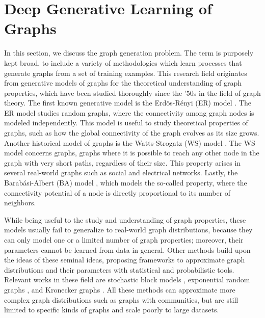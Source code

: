 \section{Deep Generative Learning of Graphs}
In this section, we discuss the graph generation problem. The term  is purposely kept broad, to include a variety of methodologies which learn processes that generate graphs from a set of training examples. This research field originates from generative models of graphs for the theoretical understanding of graph properties, which have been studied thoroughly since the '50s in the field of graph theory. The first known generative model is the  Erd\"{o}s-R\'{e}nyi (ER) model \cite{erdos1959randomgraphs}. The ER model studies random graphs, where the connectivity among graph nodes is modeled independently. This model is useful to study theoretical properties of graphs, such as how the global connectivity of the graph evolves as its size grows. Another historical model of graphs is the  Watts-Strogatz (WS)  model \cite{watts1998smallworld}. The WS model concerns  graphs, \ie graphs where it is possible to reach any other node in the graph with very short paths, regardless of their size. This property arises in several real-world graphs such as social and electrical networks. Lastly, the Barab{\'a}si-Albert (BA) model \cite{barabasi1999prefatt}, which models the so-called  property, where the connectivity potential of a node is directly proportional to its number of neighbors.

While being useful to the study and understanding of graph properties, these models usually fail to generalize to real-world graph distributions, because they can only model one or a limited number of graph properties; moreover, their parameters cannot be learned from data in general. Other methods build upon the ideas of these seminal ideas, proposing frameworks to approximate graph distributions and their parameters with statistical and probabilistic tools. Relevant works in these field are stochastic block models \citep{airoldi2008mixedstochasticblock}, exponential random graphs \citep{robins2007exponentialrandomgraphs}, and Kronecker graphs \citep{leskovec2010kronecker}. All these methods can approximate more complex graph distributions such as graphs with communities, but are still limited to specific kinds of graphs and scale poorly to large datasets.

